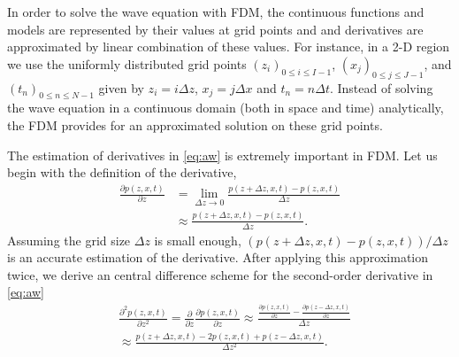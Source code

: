 \documentclass[11pt]{article}
\theoremstyle{plain}
\theoremstyle{definition}
\theoremstyle{remark}
\numberwithin{equation}{section}
\begin{document}
In order to solve the wave equation with FDM, the continuous functions and models are represented by their values at grid points and and derivatives are approximated by linear combination of these values. For instance, in a 2-D region we use the uniformly distributed grid points $(z_i)_{0\le i \le I-1 }$, $(x_j)_{0\le j \le J-1}$, and $(t_n)_{0\le n \le N-1}$ given by $z_i = i\Delta z$, $x_j = j\Delta x$ and $t_n=n\Delta t$. Instead of solving the wave equation in a continuous domain (both in space and time) analytically, the FDM provides for an approximated solution on these grid points.  

The estimation of derivatives in \eqref{eq:aw} is extremely important in FDM. Let us begin with the definition of the derivative, 
 \begin{equation}
  \begin{aligned}
  \frac{\partial p(z, x, t)}{\partial z} &= \lim\limits_{\Delta z \rightarrow 0} \frac{p(z+\Delta z, x, t) - p(z, x, t)}{\Delta z}\\
  &\approx \frac{p(z+\Delta z, x, t) - p(z, x, t)}{\Delta z}.
  \end{aligned}
  \end{equation}
 Assuming the grid size $\Delta z$ is small enough, $(p(z+\Delta z, x, t) - p(z, x, t))/\Delta z$ is an accurate estimation of the derivative. After applying this approximation twice, we derive an central difference scheme for the second-order derivative in \eqref{eq:aw}
  \begin{equation}
  \begin{aligned}
  &\frac{\partial^2 p(z, x, t)}{\partial z^2} = \frac{\partial}{\partial z}\frac{\partial p(z, x, t)}{\partial z} \approx \frac{\frac{\partial p(z, x, t)}{\partial z} - \frac{\partial p(z-\Delta z, x, t)}{\partial z}}{\Delta z}\\
  &\approx \frac{p(z+\Delta z, x, t) - 2p(z, x, t) + p(z-\Delta z, x, t)}{\Delta z^2}.
  \end{aligned}
  \end{equation}
  
\end{document}
